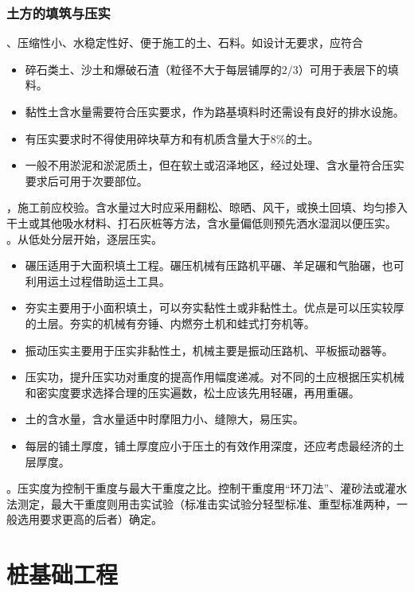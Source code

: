 \documentclass{book}
\begin{document}
\subsection{土方的填筑与压实}
、压缩性小、水稳定性好、便于施工的土、石料。如设计无要求，应符合
\begin{itemize}
    \item 碎石类土、沙土和爆破石渣（粒径不大于每层铺厚的$2/3$）可用于表层下的填料。
    \item 黏性土含水量需要符合压实要求，作为路基填料时还需设有良好的排水设施。
    \item 有压实要求时不得使用碎块草方和有机质含量大于$8\%$的土。
    \item 一般不用淤泥和淤泥质土，但在软土或沼泽地区，经过处理、含水量符合压实要求后可用于次要部位。
\end{itemize}
，施工前应校验。含水量过大时应采用翻松、晾晒、风干，或换土回填、均匀掺入干土或其他吸水材料、打石灰桩等方法，含水量偏低则预先洒水湿润以便压实。
。从低处分层开始，逐层压实。
\begin{itemize}
    \item 碾压适用于大面积填土工程。碾压机械有压路机平碾、羊足碾和气胎碾，也可利用运土过程借助运土工具。
    \item 夯实主要用于小面积填土，可以夯实黏性土或非黏性土。优点是可以压实较厚的土层。夯实的机械有夯锤、内燃夯土机和蛙式打夯机等。
    \item 振动压实主要用于压实非黏性土，机械主要是振动压路机、平板振动器等。
\end{itemize}
\begin{itemize}
    \item 压实功，提升压实功对重度的提高作用幅度递减。对不同的土应根据压实机械和密实度要求选择合理的压实遍数，松土应该先用轻碾，再用重碾。
    \item 土的含水量，含水量适中时摩阻力小、缝隙大，易压实。
    \item 每层的铺土厚度，铺土厚度应小于压土的有效作用深度，还应考虑最经济的土层厚度。
\end{itemize}
。压实度为控制干重度与最大干重度之比。控制干重度用“环刀法”、灌砂法或灌水法测定，最大干重度则用击实试验（标准击实试验分轻型标准、重型标准两种，一般选用要求更高的后者）确定。
\chapter{桩基础工程}
\end{document}
